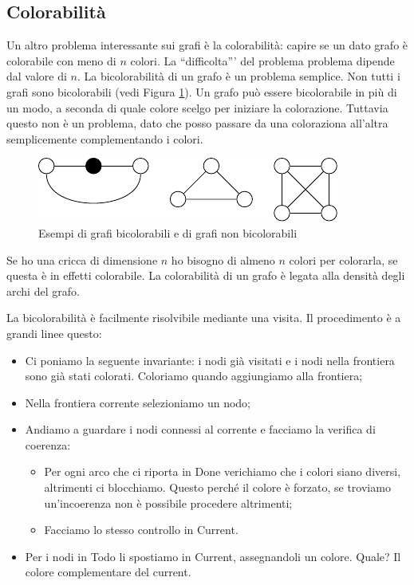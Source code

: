 \subsection{Colorabilità}

Un altro problema interessante sui grafi è la colorabilità: capire se un dato grafo è colorabile
con meno di $n$ colori. La ``difficolta''' del problema problema dipende dal valore di $n$. La
bicolorabilità di un grafo è un problema semplice. Non tutti i grafi sono bicolorabili (vedi
Figura \ref{TwoColorableGraphs}). Un grafo può essere bicolorabile in più di un modo, a seconda di
quale colore scelgo per iniziare la colorazione. Tuttavia questo non è un problema, dato che posso
passare da una coloraziona all'altra semplicemente complementando i colori.

\begin{figure}[h]
    \begin{center}
        \includegraphics{img/2ColorableGraphs.pdf}
    \end{center}
    \caption{Esempi di grafi bicolorabili e di grafi non bicolorabili}
    \label{TwoColorableGraphs}
\end{figure}

Se ho una cricca di dimensione $n$ ho bisogno di almeno $n$ colori per colorarla, se questa è in
effetti colorabile. La colorabilità di un grafo è legata alla densità degli archi del grafo.

La bicolorabilità è facilmente risolvibile mediante una visita. Il procedimento è a grandi linee
questo:
\begin{itemize}
    \item Ci poniamo la seguente invariante: i nodi già visitati e i nodi nella frontiera sono già
    stati colorati. Coloriamo quando aggiungiamo alla frontiera;
    \item Nella frontiera corrente selezioniamo un nodo;
    \item Andiamo a guardare i nodi connessi al corrente e facciamo la verifica di coerenza:
    \begin{itemize}
        \item Per ogni arco che ci riporta in Done verichiamo che i colori siano diversi, altrimenti
        ci blocchiamo. Questo perché il colore è forzato, se troviamo un'incoerenza non è
        possibile procedere altrimenti;
        \item Facciamo lo stesso controllo in Current.
    \end{itemize}
    \item Per i nodi in Todo li spostiamo in Current, assegnandoli un colore. Quale? Il colore
    complementare del current.
\end{itemize}

